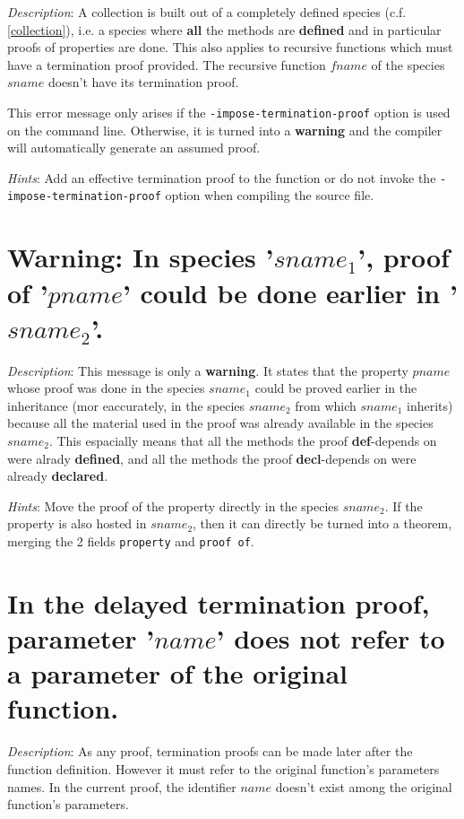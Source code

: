 {\em Description}: A collection is built  out of a completely defined species
(c.f. \ref{collection}), i.e. a species where {\bf all} the methods
are {\bf defined} and in particular proofs of properties are
done. This also applies to recursive functions which must have a
termination proof provided. The recursive function $fname$ of the
species $sname$ doesn't have its termination proof.

This error message only arises if the {\tt -impose-termination-proof}
option is used on the command line. Otherwise, it is turned into a
{\bf warning} and the compiler will automatically generate an assumed
proof.

{\em Hints}: Add an effective termination proof to the function or do
not invoke the {\tt -impose-termination-proof} option when compiling
the source file.



\section*{Warning: In species '$sname_1$', proof of '$pname$' could be done
  earlier in '$sname_2$'.}

{\em Description}: This message is only a {\bf warning}. It states
that the property $pname$ whose proof was done in the species
$sname_1$ could be proved earlier in the inheritance (mor eaccurately,
in the species $sname_2$ from which $sname_1$ inherits) because all
the material used in the proof was already available in the species
$sname_2$. This espacially means that all the methods the proof
{\bf def}-depends on were alrady {\bf defined}, and all the methods
the proof {\bf decl}-depends on were already {\bf declared}.

{\em Hints}: Move the proof of the property directly in the species
$sname_2$. If the property is also hosted in $sname_2$, then it can
directly be turned into a theorem, merging the 2 fields {\tt property}
and {\tt proof of}.



\section*{In the delayed termination proof, parameter '$name$' does
  not refer to a parameter of the original function.}

{\em Description}: As any proof, termination proofs can be made later
after the function definition. However it must refer to the original
function's parameters names. In the current proof, the identifier
$name$ doesn't exist among the original function's parameters.

